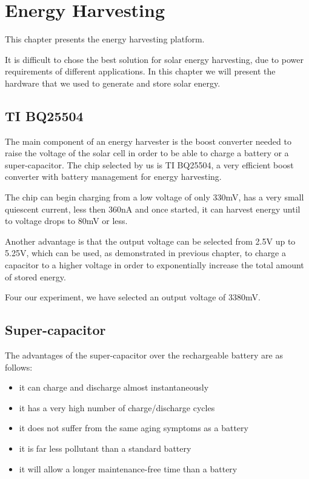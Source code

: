 \normalfont\normalsize
\chapter{Energy Harvesting}

This chapter presents the energy harvesting platform.

It is difficult to chose the best solution for solar energy harvesting, due to power requirements
of different applications. In this chapter we will present the hardware that we used to generate
and store solar energy.

\section{TI BQ25504}
The main component of an energy harvester is the boost converter needed to raise the voltage of the
solar cell in order to be able to charge a battery or a super-capacitor. The chip selected by us is
TI BQ25504, a very efficient boost converter with battery management for energy harvesting.

The chip can begin charging from a low voltage of only 330mV, has a very small quiescent current,
less then 360nA and once started, it can harvest energy until to voltage drops to 80mV or less.

Another advantage is that the output voltage can be selected from 2.5V up to 5.25V, which can be
used, as demonstrated in previous chapter, to charge a capacitor to a higher voltage in order
to exponentially increase the total amount of stored energy.

Four our experiment, we have selected an output voltage of 3380mV.

\section{Super-capacitor}
The advantages of the super-capacitor over the rechargeable battery are as follows:

\begin{itemize}
\item it can charge and discharge almost instantaneously
\item it has a very high number of charge/discharge cycles
\item it does not suffer from the same aging symptoms as a battery
\item it is far less pollutant than a standard battery
\item it will allow a longer maintenance-free time than a battery

\end{itemize}

